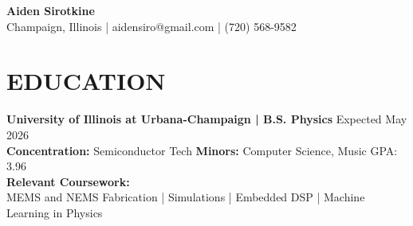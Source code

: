 \documentclass[a4paper,12pt]{extarticle}
\newcommand{\comment}[1]{}
\begin{document}
\pagestyle{empty}

\begin{center}
\textbf{\Huge Aiden Sirotkine}\\[2pt] %
Champaign, Illinois | 
{aidensiro@gmail.com} | 
(720) 568-9582 
\comment{
| Country Citizen %
}
\end{center}



\section*{EDUCATION}
\noindent
\textbf{University of Illinois at Urbana-Champaign
| B.S. Physics}
\hfill Expected May 2026 \\
\textbf{Concentration:} Semiconductor Tech \hspace{0.5cm}
\textbf{Minors:} Computer Science, Music
\hfill
GPA: 3.96
\\

\noindent
\textbf{Relevant Coursework:} \\
MEMS and NEMS Fabrication | Simulations | Embedded DSP | Machine Learning in Physics 


\end{document}
